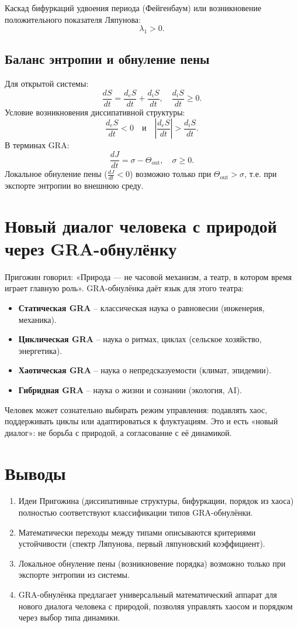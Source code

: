 \documentclass[12pt,a4paper]{article}
\begin{document}
Каскад бифуркаций удвоения периода (Фейгенбаум) или возникновение положительного показателя Ляпунова:
\[
\lambda_1 > 0.
\]

\subsection{Баланс энтропии и обнуление пены}

Для открытой системы:
\[
\frac{dS}{dt} = \frac{d_e S}{dt} + \frac{d_i S}{dt}, \quad \frac{d_i S}{dt} \ge 0.
\]
Условие возникновения диссипативной структуры:
\[
\frac{d_e S}{dt} < 0 \quad \text{и} \quad \left| \frac{d_e S}{dt} \right| > \frac{d_i S}{dt}.
\]
В терминах GRA:
\[
\frac{dJ}{dt} = \sigma - \Theta_{\text{out}}, \quad \sigma \ge 0.
\]
Локальное обнуление пены (\(\frac{dJ}{dt} < 0\)) возможно только при \(\Theta_{\text{out}} > \sigma\), т.е. при экспорте энтропии во внешнюю среду.

\section{Новый диалог человека с природой через GRA-обнулёнку}

Пригожин говорил: «Природа — не часовой механизм, а театр, в котором время играет главную роль». GRA-обнулёнка даёт язык для этого театра:

\begin{itemize}
    \item \textbf{Статическая GRA} – классическая наука о равновесии (инженерия, механика).
    \item \textbf{Циклическая GRA} – наука о ритмах, циклах (сельское хозяйство, энергетика).
    \item \textbf{Хаотическая GRA} – наука о непредсказуемости (климат, эпидемии).
    \item \textbf{Гибридная GRA} – наука о жизни и сознании (экология, AI).
\end{itemize}

Человек может сознательно выбирать режим управления: подавлять хаос, поддерживать циклы или адаптироваться к флуктуациям. Это и есть «новый диалог»: не борьба с природой, а согласование с её динамикой.

\section{Выводы}

\begin{enumerate}
    \item Идеи Пригожина (диссипативные структуры, бифуркации, порядок из хаоса) полностью соответствуют классификации типов GRA-обнулёнки.
    \item Математически переходы между типами описываются критериями устойчивости (спектр Ляпунова, первый ляпуновский коэффициент).
    \item Локальное обнуление пены (возникновение порядка) возможно только при экспорте энтропии из системы.
    \item GRA-обнулёнка предлагает универсальный математический аппарат для нового диалога человека с природой, позволяя управлять хаосом и порядком через выбор типа динамики.
\end{enumerate}
\end{document}
